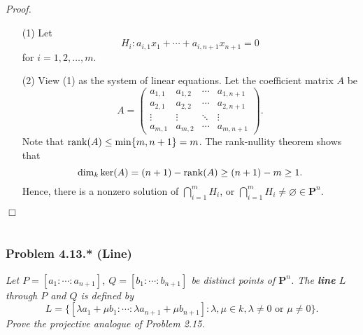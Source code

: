 \documentclass{article}
\begin{document}
\emph{Proof.}
\begin{enumerate}
\item[(1)]
  Let
  \[
    H_i: a_{i,1} x_1 + \cdots + a_{i,n+1} x_{n+1} = 0
  \]
  for $i = 1, 2, \ldots, m$.

\item[(2)]
  View (1) as the system of linear equations.
  Let the coefficient matrix $A$ be
  \[
    A
    =
    \begin{pmatrix}
      a_{1,1} & a_{1,2} & \cdots & a_{1,n+1} \\
      a_{2,1} & a_{2,2} & \cdots & a_{2,n+1} \\
      \vdots & \vdots & \ddots & \vdots \\
      a_{m,1} & a_{m,2} & \cdots & a_{m,n+1}
    \end{pmatrix}.
  \]
  Note that $\rank(A) \leq \min\{ m, n+1 \} = m$.
  The rank-nullity theorem shows that
  \[
    \dim_k \ker(A) = (n+1) - \rank(A) \geq (n+1)-m \geq 1.
  \]
  Hence, there is a nonzero solution of $\bigcap_{i=1}^{m} H_i$,
  or $\bigcap_{i=1}^{m} H_i \neq \varnothing \in \mathbf{P}^n$.
\end{enumerate}
$\Box$ \\\\






\subsubsection*{Problem 4.13.* (Line)}
\emph{Let $P = [a_1 : \cdots : a_{n+1}]$, $Q = [b_1 : \cdots : b_{n+1}]$
be distinct points of $\mathbf{P}^n$.
The \textbf{line} $L$ through $P$ and $Q$ is defined by
\[
  L = \{ [ \lambda a_1 + \mu b_1 : \cdots : \lambda a_{n+1} + \mu b_{n+1} ] :
    \lambda, \mu \in k, \lambda \neq 0 \text{ or } \mu \neq 0 \}.
\]
Prove the projective analogue of Problem 2.15.}
\end{document}
